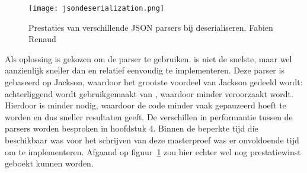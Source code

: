 \begin{figure}[h]
	\centering
	\texttt{[image: jsondeserialization.png]}
	\caption[Prestaties van JSON parsers]{Prestaties van verschillende JSON parsers bij deserialiseren.  Fabien Renaud}
	\label{fig:jsonparsersdeserialize}
\end{figure}

Als oplossing is gekozen om de  parser te gebruiken.  is niet de snelste, maar wel aanzienlijk sneller dan  en relatief eenvoudig te implementeren. Deze parser is gebaseerd op Jackson, waardoor het grootste voordeel van Jackson gedeeld wordt: achterliggend wordt gebruikgemaakt van , waardoor minder  veroorzaakt wordt. Hierdoor is minder  nodig, waardoor de code minder vaak gepauzeerd hoeft te worden en dus sneller resultaten geeft. De verschillen in performantie tussen de parsers worden besproken in hoofdstuk 4. Binnen de beperkte tijd die beschikbaar was voor het schrijven van deze masterproef was er onvoldoende tijd om  te implementeren. Afgaand op figuur~\ref{fig:jsonparsersdeserialize} zou hier echter wel nog prestatiewinst geboekt kunnen worden.